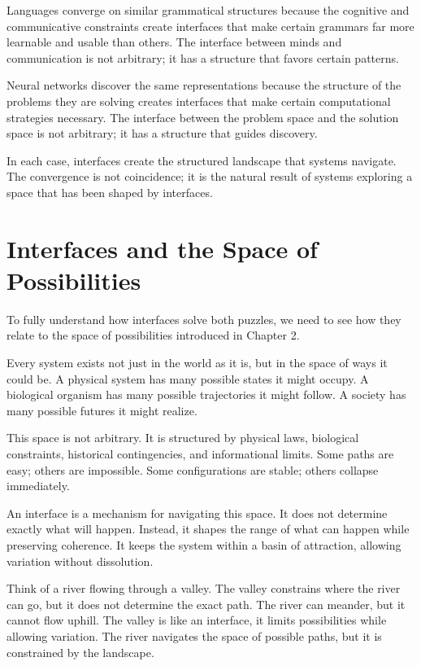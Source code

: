 \documentclass[
  openright]{book}
\begin{document}
Languages converge on similar grammatical structures because the
cognitive and communicative constraints create interfaces that make
certain grammars far more learnable and usable than others. The
interface between minds and communication is not arbitrary; it has a
structure that favors certain patterns.

Neural networks discover the same representations because the structure
of the problems they are solving creates interfaces that make certain
computational strategies necessary. The interface between the problem
space and the solution space is not arbitrary; it has a structure that
guides discovery.

In each case, interfaces create the structured landscape that systems
navigate. The convergence is not coincidence; it is the natural result
of systems exploring a space that has been shaped by interfaces.

\section{Interfaces and the Space of
Possibilities}\label{interfaces-and-the-space-of-possibilities}

To fully understand how interfaces solve both puzzles, we need to see
how they relate to the space of possibilities introduced in Chapter 2.

Every system exists not just in the world as it is, but in the space of
ways it could be. A physical system has many possible states it might
occupy. A biological organism has many possible trajectories it might
follow. A society has many possible futures it might realize.

This space is not arbitrary. It is structured by physical laws,
biological constraints, historical contingencies, and informational
limits. Some paths are easy; others are impossible. Some configurations
are stable; others collapse immediately.

An interface is a mechanism for navigating this space. It does not
determine exactly what will happen. Instead, it shapes the range of what
can happen while preserving coherence. It keeps the system within a
basin of attraction, allowing variation without dissolution.

Think of a river flowing through a valley. The valley constrains where
the river can go, but it does not determine the exact path. The river
can meander, but it cannot flow uphill. The valley is like an interface,
it limits possibilities while allowing variation. The river navigates
the space of possible paths, but it is constrained by the landscape.
\end{document}
